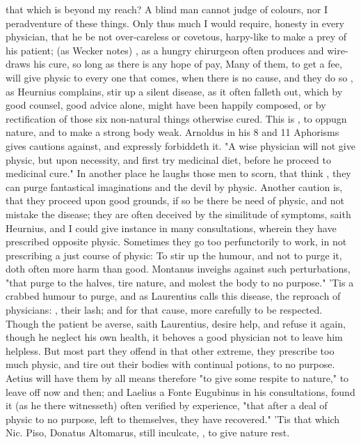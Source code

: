 {that which is beyond my reach? A blind man cannot judge of colours, nor I peradventure of these things. Only thus much I would require, honesty in every physician, that he be not over-careless or covetous, harpy-like to make a prey of his patient;  (as Wecker notes) , as a hungry chirurgeon often produces and wire-draws his cure, so long as there is any hope of pay,  Many of them, to get a fee, will give physic to every one that comes, when there is no cause, and they do so , as Heurnius complains, stir up a silent disease, as it often falleth out, which by good counsel, good advice alone, might have been happily composed, or by rectification of those six non-natural things otherwise cured. This is , to oppugn nature, and to make a strong body weak. Arnoldus in his 8 and 11 Aphorisms gives cautions against, and expressly forbiddeth it. "A wise physician will not give physic, but upon necessity, and first try medicinal diet, before he proceed to medicinal cure." In another place he laughs those men to scorn, that think , they can purge fantastical imaginations and the devil by physic. Another caution is, that they proceed upon good grounds, if so be there be need of physic, and not mistake the disease; they are often deceived by the similitude of symptoms, saith Heurnius, and I could give instance in many consultations, wherein they have prescribed opposite physic. Sometimes they go too perfunctorily to work, in not prescribing a just course of physic: To stir up the humour, and not to purge it, doth often more harm than good. Montanus  inveighs against such perturbations, "that purge to the halves, tire nature, and molest the body to no purpose." 'Tis a crabbed humour to purge, and as Laurentius calls this disease, the reproach of physicians: , their lash; and for that cause, more carefully to be respected. Though the patient be averse, saith Laurentius, desire help, and refuse it again, though he neglect his own health, it behoves a good physician not to leave him helpless. But most part they offend in that other extreme, they prescribe too much physic, and tire out their bodies with continual potions, to no purpose. Aetius  will have them by all means therefore "to give some respite to nature," to leave off now and then; and Laelius a Fonte Eugubinus in his consultations, found it (as he there witnesseth) often verified by experience, "that after a deal of physic to no purpose, left to themselves, they have recovered." 'Tis that which Nic. Piso, Donatus Altomarus, still inculcate, , to give nature rest.

}
